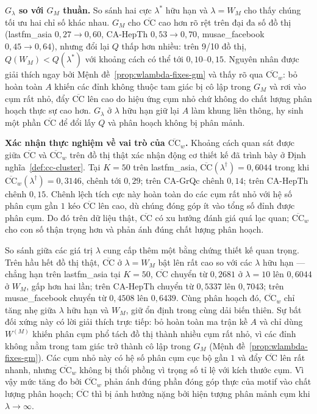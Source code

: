 \textbf{$G_\lambda$ so với $G_M$ thuần.} So sánh hai cực $\lambda^*$ hữu hạn và $\lambda = W_M$ cho thấy chúng tối ưu hai chỉ số khác nhau. $G_M$ cho $\overline{\mathrm{CC}}$ cao hơn rõ rệt trên đại đa số đồ thị (lastfm\_asia $0{,}27 \to 0{,}60$, CA-HepTh $0{,}53 \to 0{,}70$, musae\_facebook $0{,}45 \to 0{,}64$), nhưng đổi lại $Q$ thấp hơn nhiều: trên 9/10 đồ thị, $Q(W_M) < Q(\lambda^*)$ với khoảng cách có thể tới $0{,}10$--$0{,}15$. Nguyên nhân được giải thích ngay bởi Mệnh đề~\ref{prop:wlambda-fixes-gm} và thấy rõ qua $\overline{\mathrm{CC}}_w$: bỏ hoàn toàn $A$ khiến các đỉnh không thuộc tam giác bị cô lập trong $G_M$ và rơi vào cụm rất nhỏ, đẩy $\overline{\mathrm{CC}}$ lên cao do hiệu ứng cụm nhỏ chứ không do chất lượng phân hoạch thực sự cao hơn. $G_\lambda$ ở $\lambda$ hữu hạn giữ lại $A$ làm khung liên thông, hy sinh một phần $\overline{\mathrm{CC}}$ để đổi lấy $Q$ và phân hoạch không bị phân mảnh.

\textbf{Xác nhận thực nghiệm về vai trò của $\overline{\mathrm{CC}}_w$.} Khoảng cách quan sát được giữa $\overline{\mathrm{CC}}$ và $\overline{\mathrm{CC}}_w$ trên đồ thị thật xác nhận động cơ thiết kế đã trình bày ở Định nghĩa~\ref{def:cc-cluster}. Tại $K = 50$ trên lastfm\_asia, $\overline{\mathrm{CC}}(\lambda^\dagger) = 0{,}6044$ trong khi $\overline{\mathrm{CC}}_w(\lambda^\dagger) = 0{,}3146$, chênh tới $0{,}29$; trên CA-GrQc chênh $0{,}14$; trên CA-HepTh chênh $0{,}15$. Chênh lệch tích cực này hoàn toàn do các cụm rất nhỏ với hệ số phân cụm gần $1$ kéo $\overline{\mathrm{CC}}$ lên cao, dù chúng đóng góp ít vào tổng số đỉnh được phân cụm. Do đó trên dữ liệu thật, $\overline{\mathrm{CC}}$ có xu hướng đánh giá quá lạc quan; $\overline{\mathrm{CC}}_w$ cho con số thận trọng hơn và phản ánh đúng chất lượng phân hoạch.

So sánh giữa các giá trị $\lambda$ cung cấp thêm một bằng chứng thiết kế quan trọng. Trên hầu hết đồ thị thật, $\overline{\mathrm{CC}}$ ở $\lambda = W_M$ bật lên rất cao so với các $\lambda$ hữu hạn — chẳng hạn trên lastfm\_asia tại $K = 50$, $\overline{\mathrm{CC}}$ chuyển từ $0{,}2681$ ở $\lambda = 10$ lên $0{,}6044$ ở $W_M$, gấp hơn hai lần; trên CA-HepTh chuyển từ $0{,}5337$ lên $0{,}7043$; trên musae\_facebook chuyển từ $0{,}4508$ lên $0{,}6439$. Cùng phân hoạch đó, $\overline{\mathrm{CC}}_w$ chỉ tăng nhẹ giữa $\lambda$ hữu hạn và $W_M$, giữ ổn định trong cùng dải biến thiên. Sự bất đối xứng này có lời giải thích trực tiếp: bỏ hoàn toàn ma trận kề $A$ và chỉ dùng $W^{(M)}$ khiến phân cụm phổ tách đồ thị thành nhiều cụm rất nhỏ, vì các đỉnh không nằm trong tam giác trở thành cô lập trong $G_M$ (Mệnh đề~\ref{prop:wlambda-fixes-gm}). Các cụm nhỏ này có hệ số phân cụm cục bộ gần $1$ và đẩy $\overline{\mathrm{CC}}$ lên rất nhanh, nhưng $\overline{\mathrm{CC}}_w$ không bị thổi phồng vì trọng số tỉ lệ với kích thước cụm. Vì vậy mức tăng đo bởi $\overline{\mathrm{CC}}_w$ phản ánh đúng phần đóng góp thực của motif vào chất lượng phân hoạch; $\overline{\mathrm{CC}}$ thì bị ảnh hưởng nặng bởi hiện tượng phân mảnh cụm khi $\lambda \to \infty$.

